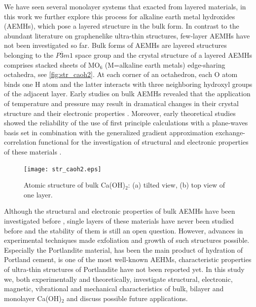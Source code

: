 We have seen several monolayer systems that exacted from layered materials, in this work we further explore this process for alkaline earth metal hydroxides (AEMHs), which pose a layered structure in the bulk form. In contrast to the abundant literature on graphenelike ultra-thin structures, few-layer AEMHs have not been investigated so far. Bulk forms of AEMHs are layered structures belonging to the $P\overline{3}m1$ space group\cite{structure1} and the crystal structure of a layered AEMHs comprises stacked sheets of MO$_6$ (M=alkaline earth metals) edge-sharing octahedra, see \autoref{fig:str_caoh2}. At each corner of an octahedron, each O atom binds one H atom and the latter interacts with three neighboring hydroxyl groups of the adjacent layer. Early studies on bulk AEMHs revealed that the application of temperature and pressure may result in dramatical changes in their crystal structure and their electronic properties\cite{amorphization1,amorphization2,amorphization3,amorphization4,transition1,transition2,transition3,transition4} . Moreover, early theoretical studies showed the reliability of the use of first principle calculations with a plane-waves basis set in combination with the generalized gradient approximation exchange-correlation functional for the investigation of structural and electronic properties of these materials\cite{Winkler1995,Baranek2001,Azuma2011,D'Arco1993} .

\begin{figure}
\centering
\texttt{[image: str\_caoh2.eps]}
\caption{\label{fig:str_caoh2} Atomic structure of bulk Ca(OH)$_2$: (a)
tilted view, (b) top view of one layer. }
\end{figure}

Although the structural and electronic properties of bulk AEMHs have been
investigated before \cite{Azuma2011,Pishtshev,Pishtshev1} , single layers of 
these materials have never been studied before and the stability of them is 
still an open question. However, advances 
in experimental techniques made exfoliation and growth of such 
structures possible.\cite{new1,new2} Especially the Portlandite material, 
has been the 
main product of hydration of Portland cement, is one of the most well-known 
AEHMs, characteristic properties of ultra-thin structures of Portlandite have 
not been reported yet. In this study we, both experimentally and theoretically, 
investigate structural, electronic, magnetic, vibrational and mechanical 
characteristics of bulk, bilayer and monolayer Ca(OH)$_{2}$ and discuss possible 
future applications.  

